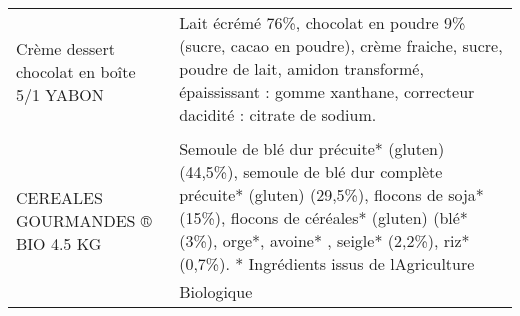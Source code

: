 \begin{longtable}{p{5cm}p{10cm}}
                                                                Crème dessert chocolat en boîte 5/1 YABON &                                                                                                                                                                                                                                                                                                                                                                                                                                                                                                                                                                                                                                                                                                                                                                                                                                       Lait écrémé 76\%, chocolat en poudre 9\% (sucre, cacao en poudre), crème fraiche, sucre, poudre de lait, amidon transformé, épaississant : gomme xanthane, correcteur dacidité : citrate de sodium. \\
                                                                         CEREALES GOURMANDES ® BIO 4.5 KG &                                                                                                                                                                                                                                                                                                                                                                                                                                                                                                                                                                                                                                                                                                                                                                  Semoule de blé dur précuite* (gluten) (44,5\%), semoule de blé dur complète précuite* (gluten) (29,5\%), flocons de soja* (15\%), flocons de céréales* (gluten) (blé* (3\%), orge*, avoine* , seigle* (2,2\%), riz* (0,7\%).  * Ingrédients issus de lAgriculture Biologique \\

\end{longtable}
